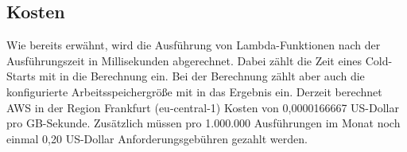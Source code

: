 \subsection{Kosten}
Wie bereits erwähnt, wird die Ausführung von Lambda-Funktionen nach der Ausführungszeit in Millisekunden abgerechnet. Dabei zählt die Zeit eines Cold-Starts mit in die Berechnung ein. Bei der Berechnung zählt aber auch die konfigurierte Arbeitsspeichergröße mit in das Ergebnis ein. Derzeit berechnet AWS in der Region Frankfurt (eu-central-1) Kosten von 0,0000166667 US-Dollar pro GB-Sekunde\cite{noauthor_lambda_nodate}. Zusätzlich müssen pro 1.000.000 Ausführungen im Monat noch einmal 0,20 US-Dollar Anforderungsgebühren gezahlt werden.